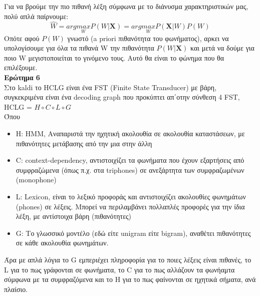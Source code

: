 \documentclass{article}
\begin{document}
Για να βρούμε την πιο πιθανή λέξη σύμφωνα με το διάνυσμα χαρακτηριστικών μας, πολύ απλά παίρνουμε:
\begin{equation*}
\hat{W} = arg\underset{W}{max}P(W|\boldsymbol{X}) = arg\underset{W}{max}P(\boldsymbol{X}|W) P(W)
\end{equation*}
Οπότε αφού $P(W)$ γνωστό (a priori πιθανότητα του φωνήματος), αρκει να υπολογίσουμε για όλα τα πιθανά W την πιθανότητα $P(W|\boldsymbol{X})$ και μετά να δούμε για ποιο W μεγιστοποιείται το γινόμενο τους. Αυτό θα είναι το φώνημα που θα επιλέξουμε.
%
\\[9mm]
\textbf{Ερώτημα 6}
\\[1mm]
Στο kaldi το HCLG είναι ένα FST (Finite State Transducer) με βάρη, συγκεκριμένα είναι ένα decoding graph που προκύπτει απ΄οτην σύνθεση 4 FST, HCLG = $H \circ C \circ L \circ G$
\\[1mm]
Όπου
\begin{itemize}
\item H: HMM, Αναπαριστά την ηχητική ακολουθία σε ακολουθία καταστάσεων, με πιθανότητες μετάβασης από την μια στην άλλη
\item C: context-dependency, αντιστοιχίζει τα φωνήματα που έχουν εξαρτήσεις από συμφραζώμενα (όπως π.χ. στα triphones) σε ανεξάρτητα των συμφραζωμένων (monophone)
\item L: Lexicon, είναι το λεξικό προφοράς και αντιστοιχίζει ακολουθίες φωνημάτων (phones) σε λέξεις. Μπορεί να περιλαμβάνει πολλαπλές προφορές για την ίδια λέξη, με αντίστοιχα βάρη (πιθανότητες)
%
\item G: Το γλωσσικό μοντέλο (εδώ είτε unigram είτε bigram), αναθέτει πιθανότητες σε κάθε ακολουθία φωνημάτων.
\end{itemize}
\vspace*{1.5mm}
Άρα με απλά λόγια το G εμπεριέχει πληροφορία για το ποιες λέξεις είναι πιθανές, το L για το πως γράφονται σε φωνήματα, το C για το πως αλλάζουν τα φωνήαμτα σύμφωνα με τα συμφραζόμενα και το H για το πως φαίνονται σε ηχητικά σήματα, ανά πλαίσιο. 
\end{document}
